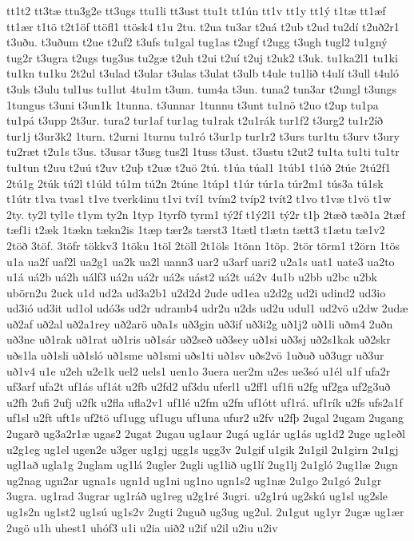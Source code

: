 {tt1t2
tt3tæ
ttu3g2e
tt3ugs
ttu1li
tt3ust
ttu1t
tt1ún
tt1v
tt1y
tt1ý
t1tæ
tt1æf
tt1ær
t1tö
t2t1öf
ttöfl1
ttösk4
t1u
2tu.
t2ua
tu3ar
t2uá
t2ub
t2ud
tu2dí
t2uð2r1
t3uðu.
t3uðum
t2ue
t2uf2
t3ufs
tu1gal
tug1as
t2ugf
t2ugg
t3ugh
tugl2
tu1gný
tug2r
t3ugra
t2ugs
tug3us
tu2gæ
t2uh
t2ui
t2uí
t2uj
t2uk2
t3uk.
tu1ka2l1
tu1ki
tu1kn
tu1ku
2t2ul
t3ulad
t3ular
t3ulas
t3ulat
t3ulb
t4ule
tu1lið
t4ulí
t3ull
t4uló
t3uls
t3ulu
tul1us
tu1lut
4tu1m
t3um.
tum4a
t3un.
tuna2
tun3ar
t2ungl
t3ungs
1tungus
t3uni
t3un1k
1tunna.
t3unnar
1tunnu
t3unt
tu1nö
t2uo
t2up
tu1pa
tu1pá
t3upp
2t3ur.
tura2
tur1af
tur1ag
tu1rak
t2u1rák
tur1f2
t3urg2
tu1r2íð
tur1j
t3ur3k2
1turn.
t2urni
1turnu
tu1ró
t3ur1p
tur1r2
t3urs
tur1tu
t3urv
t3ury
tu2ræt
t2u1s
t3us.
t3usar
t3usg
tus2l
1tuss
t3ust.
t3ustu
t2ut2
tu1ta
tu1ti
tu1tr
tu1tun
t2uu
t2uú
t2uv
t2uþ
t2uæ
t2uö
2tú.
t1úa
túal1
1túb1
t1úð
2túe
2tú2f1
2tú1g
2túk
tú2l
t1úld
tú1m
tú2n
2túne
1túp1
t1úr
túr1a
túr2m1
tús3a
tú1sk
t1útr
t1va
tvas1
t1ve
tverk4inu
t1vi
tví1
tvím2
tvíp2
tvít2
t1vo
t1væ
t1vö
t1w
2ty.
ty2l
tyl1e
t1ym
ty2n
1typ
1tyrfð
tyrm1
tý2f
t1ý2l1
tý2r
t1þ
2tæð
tæð1a
2tæf
tæf1i
t2æk
1tækn
tækn2is
1tæp
tær2s
tærst3
1tætl
t1ætn
tætt3
t1ætu
tæ1v2
2töð
3töf.
3töfr
tökkv3
1töku
1töl
2töll
2t1öls
1tönn
1töp.
2tör
törm1
t2örn
1tös
u1a
ua2f
uaf2l
ua2g1
ua2k
ua2l
uann3
uar2
u3arf
uari2
u2a1s
uat1
uate3
ua2to
u1á
uá2b
uá2h
uálf3
uá2n
uá2r
uá2s
uást2
uá2t
uá2v
4u1b
u2bb
u2bc
u2bk
ubörn2u
2uck
u1d
ud2a
ud3a2b1
u2d2d
2ude
ud1ea
u2d2g
ud2i
udind2
ud3io
ud3ió
ud3it
ud1ol
udó3s
ud2r
udramb4
udr2u
u2ds
ud2u
udul1
ud2vö
u2dw
2udæ
uð2af
uð2al
uð2a1rey
uð2arö
uða1s
uð3gin
uð3if
uð3i2g
uð1j2
uð1li
uðm4
2uðn
uð3ne
uð1rak
uð1rat
uð1ris
uð1sár
uð2seð
uð3sey
uð1si
uð3sj
uð2s1kak
uð2skr
uðs1la
uð1sli
uð1sló
uð1sme
uð1smi
uðs1ti
uð1sv
uðs2vö
1uðuð
uð3ugr
uð3ur
uð1v4
u1e
u2eh
u2e1k
uel2
uels1
uen1o
3uera
uer2m
u2es
ue3só
u1él
u1f
ufa2r
uf3arf
ufa2t
uf1ás
uf1át
u2fb
u2fd2
uf3du
uferl1
u2ff1
uf1fi
u2fg
uf2ga
uf2g3uð
u2fh
2ufi
2ufj
u2fk
u2fla
ufla2v1
uf1lé
u2fm
u2fn
uf1ótt
uf1rá.
uf1rík
u2fs
ufs2a1f
uf1sl
u2ft
uft1s
uf2tö
uf1ugg
uf1ugu
uf1una
ufur2
u2fv
u2fþ
2ugal
2ugam
2ugang
2ugarð
ug3a2r1æ
ugas2
2ugat
2ugau
ug1aur
2ugá
ug1ár
ug1ás
ug1d2
2uge
ug1eðl
u2g1eg
ug1el
ugen2e
u3ger
ug1gj
ugg1s
ugg3v
2u1gif
u1gik
2u1gil
2u1girn
2u1gj
ugl1að
ugla1g
2uglam
ug1lá
2ugler
2ugli
ug1lið
ug1lí
2ug1lj
2u1gló
2ug1læ
2ugn
ug2nag
ugn2ar
ugna1s
ugn1d
ug1ni
ug1no
ugn1s2
ug1næ
2u1go
2u1gó
2u1gr
3ugra.
ug1rad
3ugrar
ug1ráð
ug1reg
u2g1ré
3ugri.
u2g1rú
ug2skú
ug1sl
ug2sle
ug1s2n
ug1st2
ug1sú
ug1s2v
2ugti
2uguð
ug3ug
ug2ul.
2u1gut
ug1yr
2ugæ
ug1ær
2ugö
u1h
uhest1
uhóf3
u1i
u2ia
uið2
u2if
u2il
u2iu
u2iv
}

